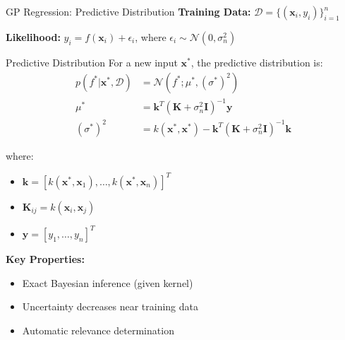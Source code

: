 \documentclass[aspectratio=169,11pt]{beamer}
\newcommand{\Normal}{\mathcal{N}}
\newcommand{\bx}{\mathbf{x}}
\begin{document}
\begin{frame}{GP Regression: Predictive Distribution}
\textbf{Training Data:} $\mathcal{D} = \{(\bx_i, y_i)\}_{i=1}^n$

\textbf{Likelihood:} $y_i = f(\bx_i) + \epsilon_i$, where $\epsilon_i \sim \Normal(0, \sigma_n^2)$

\begin{block}{Predictive Distribution}
For a new input $\bx^*$, the predictive distribution is:
\begin{align}
p(f^*|\bx^*, \mathcal{D}) &= \Normal(f^*; \mu^*, (\sigma^*)^2)\\
\mu^* &= \mathbf{k}^T (\mathbf{K} + \sigma_n^2 \mathbf{I})^{-1} \mathbf{y}\\
(\sigma^*)^2 &= k(\bx^*, \bx^*) - \mathbf{k}^T (\mathbf{K} + \sigma_n^2 \mathbf{I})^{-1} \mathbf{k}
\end{align}
\end{block}

where:
\begin{itemize}
\item $\mathbf{k} = [k(\bx^*, \bx_1), \ldots, k(\bx^*, \bx_n)]^T$
\item $\mathbf{K}_{ij} = k(\bx_i, \bx_j)$
\item $\mathbf{y} = [y_1, \ldots, y_n]^T$
\end{itemize}

\textbf{Key Properties:}
\begin{itemize}
\item Exact Bayesian inference (given kernel)
\item Uncertainty decreases near training data
\item Automatic relevance determination
\end{itemize}
\end{frame}
\end{document}
